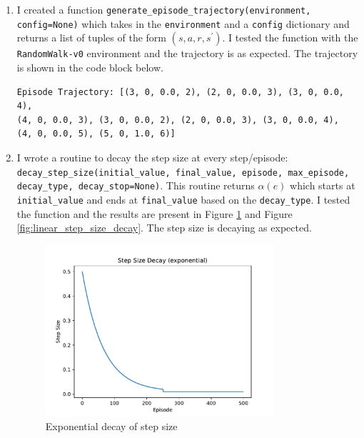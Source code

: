 \begin{enumerate}
    
    \item I created a function \texttt{generate\_episode\_trajectory(environment, config=None)} which takes in the \texttt{environment} and a \texttt{config} dictionary and returns a list of tuples of the form $(s, a, r, s^{\prime})$. I tested the function with the \texttt{RandomWalk-v0} environment and the trajectory is as expected. The trajectory is shown in the code block below.
    \begin{verbatim}
Episode Trajectory: [(3, 0, 0.0, 2), (2, 0, 0.0, 3), (3, 0, 0.0, 4), 
(4, 0, 0.0, 3), (3, 0, 0.0, 2), (2, 0, 0.0, 3), (3, 0, 0.0, 4), 
(4, 0, 0.0, 5), (5, 0, 1.0, 6)]
    \end{verbatim}
    
    \item I wrote a routine to decay the step size at every step/episode: \texttt{decay\_step\_size(initial\_value, final\_value, episode, max\_episode, decay\_type, decay\_stop=None)}. This routine returns $\alpha(e)$ which starts at \texttt{initial\_value} and ends at \texttt{final\_value} based on the \texttt{decay\_type}. I tested the function and the results are present in Figure \ref{fig:exp_step_size_decay} and Figure \ref{fig:linear_step_size_decay}. The step size is decaying as expected.
    \begin{figure}[h]
        \centering
        \includegraphics[width=0.8\textwidth]{images/mc_td/step_size_decay_exponential.pdf}
        \caption{Exponential decay of step size}
        \label{fig:exp_step_size_decay}
    \end{figure}
    \begin{figure}[h]
        \centering

\end{figure}
\end{enumerate}
